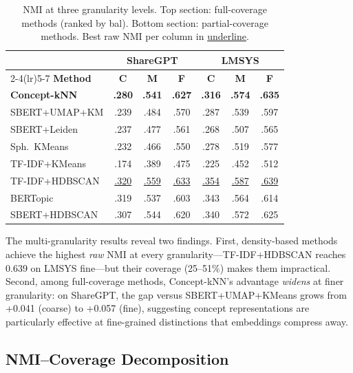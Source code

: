 \documentclass[conference]{IEEEtran}
\begin{document}
\begin{table}[t]
\caption{NMI at three granularity levels. Top section: full-coverage methods (ranked by bal). Bottom section: partial-coverage methods. Best raw NMI per column in \underline{underline}.}
\label{tab:multigran}
\centering
\small
\setlength{\tabcolsep}{3.5pt}
\begin{tabular}{@{}l ccc ccc@{}}
\toprule
& \multicolumn{3}{c}{\textbf{ShareGPT}} & \multicolumn{3}{c}{\textbf{LMSYS}} \\
\cmidrule(lr){2-4}\cmidrule(lr){5-7}
\textbf{Method} & \textbf{C} & \textbf{M} & \textbf{F} & \textbf{C} & \textbf{M} & \textbf{F} \\
\midrule
\textbf{Concept-kNN} & \textbf{.280} & \textbf{.541} & \textbf{.627} & \textbf{.316} & \textbf{.574} & \textbf{.635} \\
SBERT+UMAP+KM & .239 & .484 & .570 & .287 & .539 & .597 \\
SBERT+Leiden & .237 & .477 & .561 & .268 & .507 & .565 \\
Sph.\ KMeans & .232 & .466 & .550 & .278 & .519 & .577 \\
TF-IDF+KMeans & .174 & .389 & .475 & .225 & .452 & .512 \\
\midrule
TF-IDF+HDBSCAN & \underline{.320} & \underline{.559} & \underline{.633} & \underline{.354} & \underline{.587} & \underline{.639} \\
BERTopic & .319 & .537 & .603 & .343 & .564 & .614 \\
SBERT+HDBSCAN & .307 & .544 & .620 & .340 & .572 & .625 \\
\bottomrule
\end{tabular}
\end{table}

The multi-granularity results reveal two findings. First, density-based methods achieve the highest \textit{raw} NMI at every granularity---TF-IDF+HDBSCAN reaches 0.639 on LMSYS fine---but their coverage (25--51\%) makes them impractical. Second, among full-coverage methods, Concept-kNN's advantage \textit{widens} at finer granularity: on ShareGPT, the gap versus SBERT+UMAP+KMeans grows from +0.041 (coarse) to +0.057 (fine), suggesting concept representations are particularly effective at fine-grained distinctions that embeddings compress away.

\subsection{NMI--Coverage Decomposition}
\end{document}
